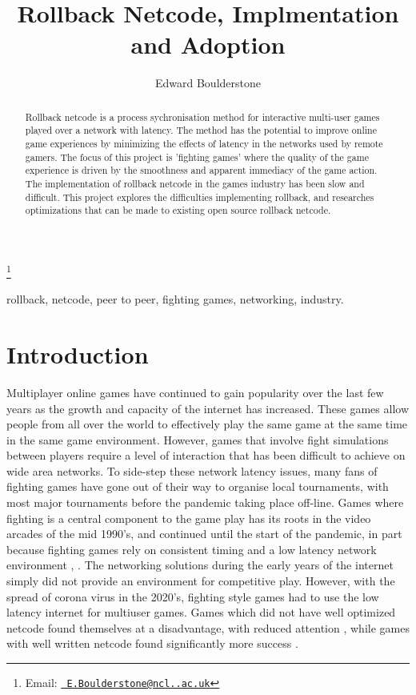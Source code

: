\documentclass{entcs}
\begin{document}
\begin{frontmatter}
\title{Rollback Netcode, Implmentation and Adoption}
\author{Edward Boulderstone}
  \address{School of Computing Science, Newcastle University, UK} 
\thanks[nigellemail]{Email:
    \href{mailto:E.Boulderstone@ncl..ac.uk} {\texttt{\normalshape
        E.Boulderstone@ncl..ac.uk}}}

			
				
\begin{abstract} 
Rollback netcode is a process sychronisation method for interactive multi-user games played over a network with latency. The method has the potential to improve online game experiences by minimizing the effects of latency in the networks used by remote gamers. The focus of this project is 'fighting games' where the quality of the game experience is driven by the smoothness and apparent immediacy of the game action. The implementation of rollback netcode in the games industry has been slow and difficult. This project explores the difficulties implementing rollback, and researches optimizations that can be made to existing open source rollback netcode.
\end{abstract}

\begin{keyword}
rollback, netcode, peer to peer, fighting games, networking, industry.
\end{keyword}
\end{frontmatter}

\section{Introduction}\label{sec: introduction}
Multiplayer online games have continued to gain popularity over the last few years as the growth and capacity of the internet has increased. These games allow people from all over the world to effectively play the same game at the same time in the same game environment. However, games that involve fight simulations between players require a level of interaction that has been difficult to achieve on wide area networks. To side-step these network latency issues, many fans of fighting games have gone out of their way to organise local tournaments, with most major tournaments before the pandemic taking place off-line\cite{FGCMajors}. Games where fighting is a central component to the game play has its roots in the video arcades of the mid 1990's,\cite{FirstUSTournament} and continued until the start of the pandemic, in part because fighting games rely on consistent timing and a low latency network environment \cite{DelayVsRollback}, \cite{BadNetcode}. The networking solutions during the early years of the internet simply did not provide an environment for competitive play\cite{FGCAsEsport}. However, with the spread of corona virus in the 2020's, fighting style games had to use the low latency internet for multiuser games. Games which did not have well optimized netcode found themselves at a disadvantage, with reduced attention \cite{SmashTournamentsInThePandemic}, while games with well written netcode found significantly more success  \cite{GuiltyGearStriveInThePandemic}.
\end{document}
